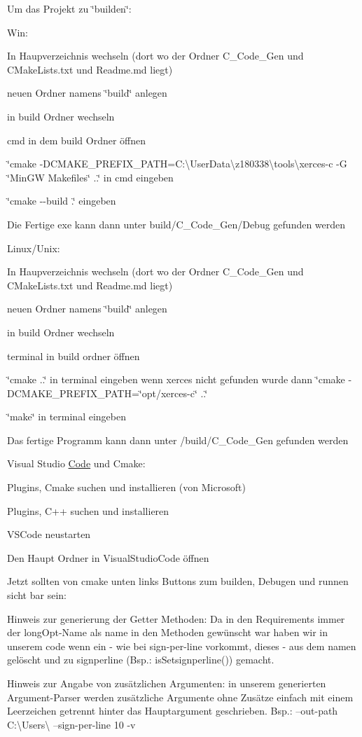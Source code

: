 \label{index_mainpage}%
%
 Um das Projekt zu \char`\"{}builden\char`\"{}\+:

Win\+:

In Haupverzeichnis wechseln (dort wo der Ordner C\+\_\+\+Code\+\_\+\+Gen und CMake\+Lists.\+txt und Readme.\+md liegt)

neuen Ordner namens \char`\"{}build\char`\"{} anlegen

in build Ordner wechseln

cmd in dem build Ordner öffnen

\char`\"{}cmake -\/\+DCMAKE\+\_\+\+PREFIX\+\_\+\+PATH=\+C\+:\textbackslash{}\+User\+Data\textbackslash{}z180338\textbackslash{}tools\textbackslash{}xerces-\/c -\/\+G \char`\"{}Min\+GW Makefiles\char`\"{} ..\char`\"{} in cmd eingeben

\char`\"{}cmake -\/-\/build .\char`\"{} eingeben

Die Fertige exe kann dann unter build/\+C\+\_\+\+Code\+\_\+\+Gen/\+Debug gefunden werden

Linux/\+Unix\+:

In Haupverzeichnis wechseln (dort wo der Ordner C\+\_\+\+Code\+\_\+\+Gen und CMake\+Lists.\+txt und Readme.\+md liegt)

neuen Ordner namens \char`\"{}build\char`\"{} anlegen

in build Ordner wechseln

terminal in build ordner öffnen

\char`\"{}cmake ..\char`\"{} in terminal eingeben wenn xerces nicht gefunden wurde dann \char`\"{}cmake -\/\+DCMAKE\+\_\+\+PREFIX\+\_\+\+PATH=\char`\"{}opt/xerces-\/c\char`\"{} ..\char`\"{}

\char`\"{}make\char`\"{} in terminal eingeben

Das fertige Programm kann dann unter /build/\+C\+\_\+\+Code\+\_\+\+Gen gefunden werden

Visual Studio \mbox{\hyperlink{class_code}{Code}} und Cmake\+:

Plugins, Cmake suchen und installieren (von Microsoft)

Plugins, C++ suchen und installieren

VSCode neustarten

Den Haupt Ordner in Visual\+Studio\+Code öffnen

Jetzt sollten von cmake unten links Buttons zum builden, Debugen und runnen sicht bar sein\+:

Hinweis zur generierung der Getter Methoden\+: Da in den Requirements immer der long\+Opt-\/\+Name als name in den Methoden gewünscht war haben wir in unserem code wenn ein \textquotesingle{}-\/\textquotesingle{} wie bei sign-\/per-\/line vorkommt, dieses \textquotesingle{}-\/\textquotesingle{} aus dem namen gelöscht und zu signperline (Bsp.\+: is\+Setsignperline()) gemacht.

Hinweis zur Angabe von zusätzlichen Argumenten\+: in unserem generierten Argument-\/\+Parser werden zusätzliche Argumente ohne Zusätze einfach mit einem Leerzeichen getrennt hinter das Hauptargument geschrieben. Bsp.\+: --out-\/path C\+:\textbackslash{}\+Users\textbackslash{} --sign-\/per-\/line 10 -\/v 
